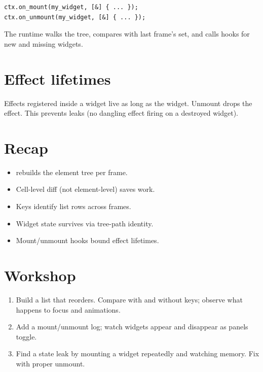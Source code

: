 \begin{lstlisting}
ctx.on_mount(my_widget, [&] { ... });
ctx.on_unmount(my_widget, [&] { ... });
\end{lstlisting}

The runtime walks the tree, compares with last frame's set,
and calls hooks for new and missing widgets.

\section{Effect lifetimes}

Effects registered inside a widget live as long as the
widget. Unmount drops the effect. This prevents leaks (no
dangling effect firing on a destroyed widget).

\section{Recap}

\begin{recap}
\begin{itemize}[leftmargin=*]
  \item \maya{} rebuilds the element tree per frame.
  \item Cell-level diff (not element-level) saves work.
  \item Keys identify list rows across frames.
  \item Widget state survives via tree-path identity.
  \item Mount/unmount hooks bound effect lifetimes.
\end{itemize}
\end{recap}

\section*{Workshop}

\begin{enumerate}[leftmargin=*]
  \item Build a list that reorders. Compare with and
    without keys; observe what happens to focus and
    animations.
  \item Add a mount/unmount log; watch widgets appear and
    disappear as panels toggle.
  \item Find a state leak by mounting a widget repeatedly
    and watching memory. Fix with proper unmount.
\end{enumerate}
